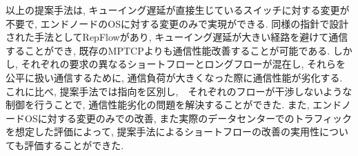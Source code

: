 以上の提案手法は, キューイング遅延が直接生じているスイッチに対する変更が不要で, エンドノードのOSに対する変更のみで実現ができる. 
同様の指針で設計された手法としてRepFlowがあり, キューイング遅延が大きい経路を避けて通信することができ,
既存のMPTCPよりも通信性能改善することが可能である. 
しかし, それぞれの要求の異なるショートフローとロングフローが混在し, それらを公平に扱い通信するために, 通信負荷が大きくなった際に通信性能が劣化する. 
これに比べ, 提案手法では指向を区別し,　それぞれのフローが干渉しないような制御を行うことで, 通信性能劣化の問題を解決することができた. 
また, エンドノードOSに対する変更のみでの改善, また実際のデータセンターでのトラフィックを想定した評価によって,
提案手法によるショートフローの改善の実用性についても評価することができた. 

